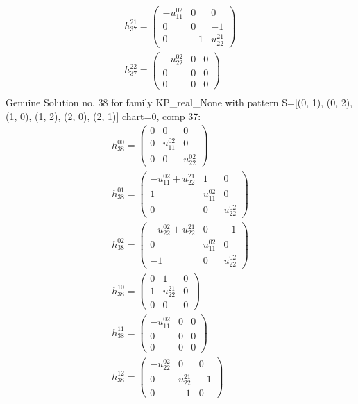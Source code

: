 \documentclass[a4paper, 11pt, twoside, onecolumn]{article}
\begin{document}
\begin{landscape}
\begin{gather*}
	 h_{37}^{21}=\begin{pmatrix}- u^{02}_{11} & 0 & 0\\0 & 0 & -1\\0 & -1 & u^{21}_{22}\end{pmatrix}\\ 
	 h_{37}^{22}=\begin{pmatrix}- u^{02}_{22} & 0 & 0\\0 & 0 & 0\\0 & 0 & 0\end{pmatrix}\\ 
\end{gather*} 
Genuine Solution no. 38 for family KP_real_None with pattern S=[(0, 1), (0, 2), (1, 0), (1, 2), (2, 0), (2, 1)] chart=0, comp 37: 
\begin{gather*} 
	 h_{38}^{00}=\begin{pmatrix}0 & 0 & 0\\0 & u^{02}_{11} & 0\\0 & 0 & u^{02}_{22}\end{pmatrix}\\ 
	 h_{38}^{01}=\begin{pmatrix}- u^{02}_{11} + u^{21}_{22} & 1 & 0\\1 & u^{02}_{11} & 0\\0 & 0 & u^{02}_{22}\end{pmatrix}\\ 
	 h_{38}^{02}=\begin{pmatrix}- u^{02}_{22} + u^{21}_{22} & 0 & -1\\0 & u^{02}_{11} & 0\\-1 & 0 & u^{02}_{22}\end{pmatrix}\\ 
	 h_{38}^{10}=\begin{pmatrix}0 & 1 & 0\\1 & u^{21}_{22} & 0\\0 & 0 & 0\end{pmatrix}\\ 
	 h_{38}^{11}=\begin{pmatrix}- u^{02}_{11} & 0 & 0\\0 & 0 & 0\\0 & 0 & 0\end{pmatrix}\\ 
	 h_{38}^{12}=\begin{pmatrix}- u^{02}_{22} & 0 & 0\\0 & u^{21}_{22} & -1\\0 & -1 & 0\end{pmatrix}\\ 

\end{gather*}
\end{landscape}
\end{document}
